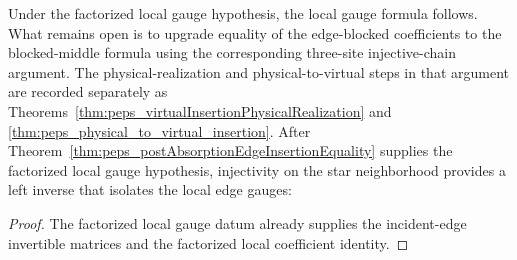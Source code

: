 \begin{theorem}%
    \label{thm:localGauge_exists}
    \leanok
    Under the factorized local gauge hypothesis, the local gauge formula follows.
    What remains open is to upgrade equality of the edge-blocked coefficients to
    the blocked-middle formula using the corresponding three-site
    injective-chain argument. The physical-realization and physical-to-virtual
    steps in that argument are recorded separately as
    Theorems~\ref{thm:peps_virtualInsertionPhysicalRealization} and
    \ref{thm:peps_physical_to_virtual_insertion}.
    After Theorem~\ref{thm:peps_postAbsorptionEdgeInsertionEquality} supplies
    the factorized local gauge hypothesis, injectivity on the star neighborhood
    provides a left inverse that isolates the local edge gauges:
    \begin{center}
        \TNPEPSLocalGaugeExtraction
    \end{center}
\end{theorem}
\begin{proof}\leanok
    The factorized local gauge datum already supplies the incident-edge
    invertible matrices and the factorized local coefficient identity.
\end{proof}

